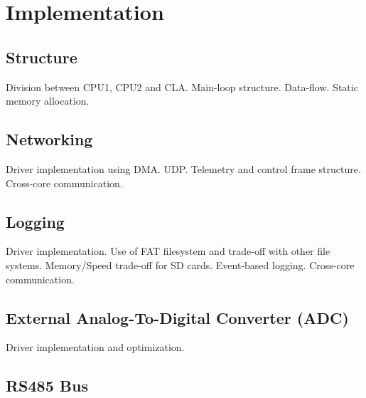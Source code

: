 
\chapter{Implementation}

\section{Structure}

Division between CPU1, CPU2 and CLA. Main-loop structure. Data-flow. Static memory allocation.

\section{Networking}

Driver implementation using DMA. UDP. Telemetry and control frame structure. Cross-core communication.

\section{Logging}

Driver implementation. Use of FAT filesystem and trade-off with other file systems. Memory/Speed trade-off for SD cards. Event-based logging. Cross-core communication.

\section{External Analog-To-Digital Converter (ADC)}

Driver implementation and optimization.

\section{RS485 Bus}

